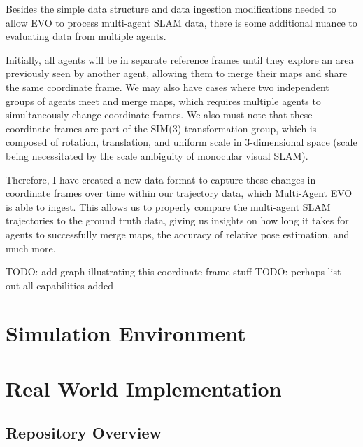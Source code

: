 Besides the simple data structure and data ingestion modifications needed to allow EVO to process multi-agent SLAM data, there is some additional nuance to evaluating data from multiple agents.

Initially, all agents will be in separate reference frames until they explore an area previously seen by another agent, allowing them to merge their maps and share the same coordinate frame. We may also have cases where two independent groups of agents meet and merge maps, which requires multiple agents to simultaneously change coordinate frames. We also must note that these coordinate frames are part of the SIM(3) transformation group, which is composed of rotation, translation, and uniform scale in 3-dimensional space (scale being necessitated by the scale ambiguity of monocular visual SLAM).

Therefore, I have created a new data format to capture these changes in coordinate frames over time within our trajectory data, which Multi-Agent EVO is able to ingest. This allows us to properly compare the multi-agent SLAM trajectories to the ground truth data, giving us insights on how long it takes for agents to successfully merge maps, the accuracy of relative pose estimation, and much more.

TODO: add graph illustrating this coordinate frame stuff
TODO: perhaps list out all capabilities added

\section{Simulation Environment}
\label{sec:simulation-environment}

\section{Real World Implementation}
\label{sec:real-world-implementation}

\subsection{Repository Overview}
\label{sec:repository-overview}





